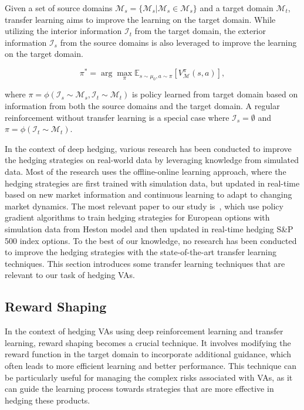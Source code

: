 Given a set of source domains $\bm{\mathcal{M}}_s= \{ \mathcal{M}_s| \mathcal{M}_s \in \bm{\mathcal{M}}_s\}$ and a target domain $\mathcal{M}_t$, transfer learning aims to improve the learning on the target domain.
While utilizing the interior information $\mathcal{I}_t$ from the target domain, the exterior information $\mathcal{I}_s$ from the source domains is also leveraged to improve the learning on the target domain.

\begin{equation}
    \pi^* = \arg \max_\pi \mathbb{E}_{s \sim \mu_0, a \sim \pi} \left[V_{\mathcal{M}}^\pi (s, a) \right], 
\end{equation}

where $\pi = \phi(\mathcal{I}_s \sim \bm{\mathcal{M}}_s, \mathcal{I}_t \sim \mathcal{M}_t)$ is policy learned from target domain based on information from both the source domains and the target domain.
A regular reinforcement without transfer learning is a special case where $\mathcal{I}_s = \emptyset$ and $\pi = \phi(\mathcal{I}_t \sim \mathcal{M}_t)$.

In the context of deep hedging, various research has been conducted to improve the hedging strategies on real-world data by leveraging knowledge from simulated data.
Most of the research uses the offline-online learning approach, where the hedging strategies are first trained with simulation data, but updated in real-time based on new market information and continuous learning to adapt to changing market dynamics.
The most relevant paper to our study is~\cite{xiao2021optimal}, which use policy gradient algorithms to train hedging strategies for European options with simulation data from Heston model and then updated in real-time hedging S\&P 500 index options.
To the best of our knowledge, no research has been conducted to improve the hedging strategies with the state-of-the-art transfer learning techniques.
This section introduces some transfer learning techniques that are relevant to our task of hedging VAs.

\subsection{Reward Shaping}

In the context of hedging VAs using deep reinforcement learning and transfer learning, reward shaping becomes a crucial technique. 
It involves modifying the reward function in the target domain to incorporate additional guidance, which often leads to more efficient learning and better performance.
This technique can be particularly useful for managing the complex risks associated with VAs, as it can guide the learning process towards strategies that are more effective in hedging these products.

